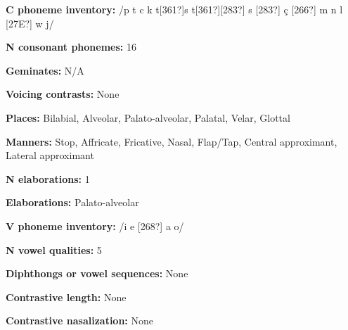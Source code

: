 \begin{styleBody}
\textbf{C phoneme inventory:} /p t c k t[361?]s t[361?][283?] s [283?] ç [266?] m n l [27E?] w j/
\end{styleBody}

\begin{styleBody}
\textbf{N consonant phonemes:} 16
\end{styleBody}

\begin{styleBody}
\textbf{Geminates:} N/A
\end{styleBody}

\begin{styleBody}
\textbf{Voicing contrasts:} None
\end{styleBody}

\begin{styleBody}
\textbf{Places:} Bilabial, Alveolar, Palato-alveolar, Palatal, Velar, Glottal
\end{styleBody}

\begin{styleBody}
\textbf{Manners:} Stop, Affricate, Fricative, Nasal, Flap/Tap, Central approximant, Lateral approximant
\end{styleBody}

\begin{styleBody}
\textbf{N elaborations:} 1
\end{styleBody}

\begin{styleBody}
\textbf{Elaborations:} Palato-alveolar
\end{styleBody}

\begin{styleBody}
\textbf{V phoneme inventory:} /i e [268?] a o/
\end{styleBody}

\begin{styleBody}
\textbf{N vowel qualities:} 5
\end{styleBody}

\begin{styleBody}
\textbf{Diphthongs or vowel sequences:} None
\end{styleBody}

\begin{styleBody}
\textbf{Contrastive length:} None
\end{styleBody}

\begin{styleBody}
\textbf{Contrastive nasalization:} None
\end{styleBody}


